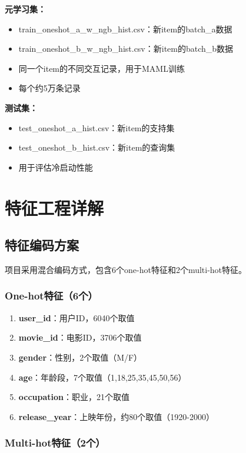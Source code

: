 \documentclass[12pt,a4paper]{article}
\begin{document}
\textbf{元学习集：}
\begin{itemize}
    \item train\_oneshot\_a\_w\_ngb\_hist.csv：新item的batch\_a数据
    \item train\_oneshot\_b\_w\_ngb\_hist.csv：新item的batch\_b数据
    \item 同一个item的不同交互记录，用于MAML训练
    \item 每个约5万条记录
\end{itemize}

\textbf{测试集：}
\begin{itemize}
    \item test\_oneshot\_a\_hist.csv：新item的支持集
    \item test\_oneshot\_b\_hist.csv：新item的查询集
    \item 用于评估冷启动性能
\end{itemize}

\section{特征工程详解}

\subsection{特征编码方案}

项目采用混合编码方式，包含6个one-hot特征和2个multi-hot特征。

\subsubsection{One-hot特征（6个）}

\begin{enumerate}
    \item \textbf{user\_id}：用户ID，6040个取值
    \item \textbf{movie\_id}：电影ID，3706个取值
    \item \textbf{gender}：性别，2个取值（M/F）
    \item \textbf{age}：年龄段，7个取值（1,18,25,35,45,50,56）
    \item \textbf{occupation}：职业，21个取值
    \item \textbf{release\_year}：上映年份，约80个取值（1920-2000）
\end{enumerate}

\subsubsection{Multi-hot特征（2个）}
\end{document}
